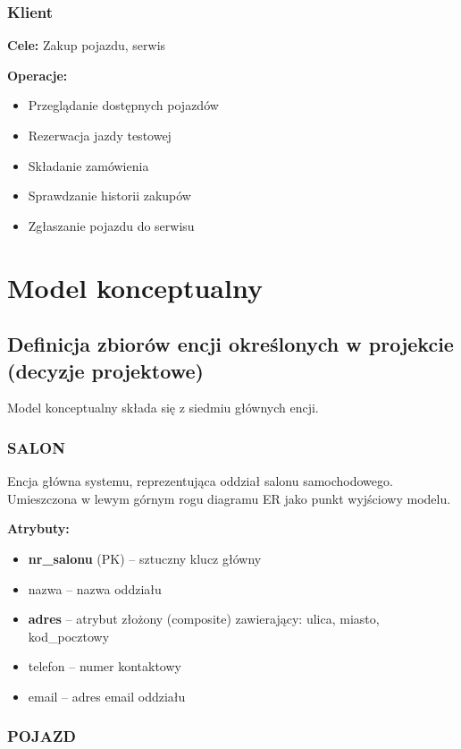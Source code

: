 \documentclass[a4paper,titleauthor]{mwart}
\begin{document}
	\subsubsection{Klient}
	
	\textbf{Cele:} Zakup pojazdu, serwis
	
	\textbf{Operacje:}
	\begin{itemize}
		\item Przeglądanie dostępnych pojazdów
		\item Rezerwacja jazdy testowej
		\item Składanie zamówienia
		\item Sprawdzanie historii zakupów
		\item Zgłaszanie pojazdu do serwisu
	\end{itemize}
	
	\section{Model konceptualny}
	
	\subsection{Definicja zbiorów encji określonych w projekcie (decyzje projektowe)}
	
	Model konceptualny składa się z siedmiu głównych encji.
	
	\subsubsection{SALON}
	
	Encja główna systemu, reprezentująca oddział salonu samochodowego. Umieszczona w lewym górnym rogu diagramu ER jako punkt wyjściowy modelu.
	
	\textbf{Atrybuty:}
	\begin{itemize}
		\item \textbf{nr\_salonu} (PK) -- sztuczny klucz główny
		\item nazwa -- nazwa oddziału
		\item \textbf{adres} -- atrybut złożony (composite) zawierający: ulica, miasto, kod\_pocztowy
		\item telefon -- numer kontaktowy
		\item email -- adres email oddziału
	\end{itemize}
	
	\subsubsection{POJAZD}
	
\end{document}
